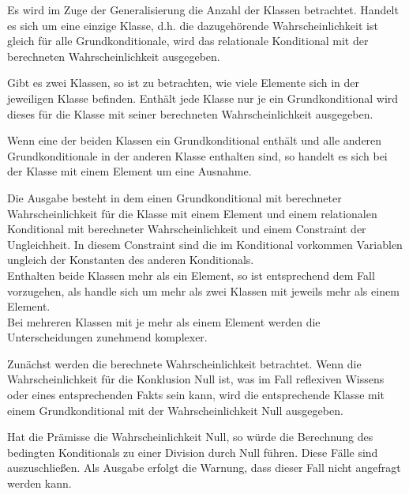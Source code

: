 \documentclass[a4paper, 11pt]{book}
\begin{document}
Es wird im Zuge der Generalisierung die Anzahl der Klassen betrachtet. Handelt es sich um eine einzige Klasse, d.h. die dazugehörende Wahrscheinlichkeit ist gleich für alle Grundkonditionale, wird das relationale Konditional mit der berechneten Wahrscheinlichkeit ausgegeben.

Gibt es zwei Klassen, so ist zu betrachten, wie viele Elemente sich in der jeweiligen Klasse befinden. Enthält jede Klasse nur je ein Grundkonditional wird dieses für die Klasse mit seiner berechneten Wahrscheinlichkeit ausgegeben.

Wenn eine der beiden Klassen ein Grundkonditional enthält und alle anderen Grundkonditionale in der anderen Klasse enthalten sind, so handelt es sich bei der Klasse mit einem Element um eine Ausnahme.

Die Ausgabe besteht in dem einen Grundkonditional mit berechneter Wahrscheinlichkeit für die Klasse mit einem Element und einem relationalen Konditional mit berechneter Wahrscheinlichkeit und einem Constraint der Ungleichheit. In diesem Constraint sind die im Konditional vorkommen Variablen ungleich der Konstanten des anderen Konditionals.\\  

Enthalten beide Klassen mehr als ein Element, so ist entsprechend dem Fall vorzugehen, als handle sich um mehr als zwei Klassen mit jeweils mehr als einem Element.\\

Bei mehreren Klassen mit je mehr als einem Element werden die Unterscheidungen zunehmend komplexer.

Zunächst werden die berechnete Wahrscheinlichkeit betrachtet. Wenn die Wahrscheinlichkeit für die Konklusion Null ist, was im Fall reflexiven Wissens oder eines entsprechenden Fakts sein kann, wird die entsprechende Klasse mit einem Grundkonditional mit der Wahrscheinlichkeit Null ausgegeben.

Hat die Prämisse die Wahrscheinlichkeit Null, so würde die Berechnung des bedingten Konditionals zu einer Division durch Null führen. Diese Fälle sind auszuschließen. Als Ausgabe erfolgt die Warnung, dass dieser Fall nicht angefragt werden kann.
\end{document}
